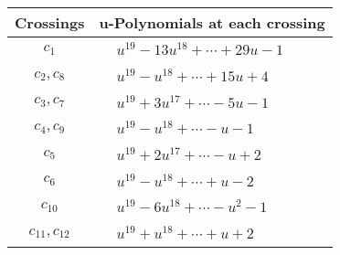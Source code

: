 \documentclass[1p]{elsarticle_modified}
\theoremstyle{definition}
\begin{document}
\begin{tabular}{m{50pt}|m{274pt}}
Crossings & \hspace{64pt}u-Polynomials at each crossing \\
\hline $$\begin{aligned}c_{1}\end{aligned}$$&$\begin{aligned}
&u^{19}-13 u^{18}+\cdots+29 u-1
\end{aligned}$\\
\hline $$\begin{aligned}c_{2},c_{8}\end{aligned}$$&$\begin{aligned}
&u^{19}- u^{18}+\cdots+15 u+4
\end{aligned}$\\
\hline $$\begin{aligned}c_{3},c_{7}\end{aligned}$$&$\begin{aligned}
&u^{19}+3 u^{17}+\cdots-5 u-1
\end{aligned}$\\
\hline $$\begin{aligned}c_{4},c_{9}\end{aligned}$$&$\begin{aligned}
&u^{19}- u^{18}+\cdots- u-1
\end{aligned}$\\
\hline $$\begin{aligned}c_{5}\end{aligned}$$&$\begin{aligned}
&u^{19}+2 u^{17}+\cdots- u+2
\end{aligned}$\\
\hline $$\begin{aligned}c_{6}\end{aligned}$$&$\begin{aligned}
&u^{19}- u^{18}+\cdots+u-2
\end{aligned}$\\
\hline $$\begin{aligned}c_{10}\end{aligned}$$&$\begin{aligned}
&u^{19}-6 u^{18}+\cdots- u^2-1
\end{aligned}$\\
\hline $$\begin{aligned}c_{11},c_{12}\end{aligned}$$&$\begin{aligned}
&u^{19}+u^{18}+\cdots+u+2
\end{aligned}$\\
\hline
\end{tabular}\\~\\
\end{document}

